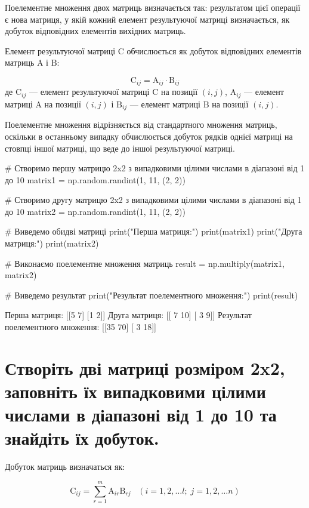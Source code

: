 \documentclass[]{article}
\newcounter{pythoncode}
\begin{document}
Поелементне множення двох матриць визначається так: результатом цієї
операції є нова матриця, у якій кожний елемент результуючої матриці
визначається, як добуток відповідних елементів вихідних матриць.

Елемент результуючої матриці \(\mathrm C\) обчислюється як добуток
відповідних елементів матриць \(\mathrm A\) і \(\mathrm B\):

\[
	\mathrm C_{ij}  = \mathrm A_{ij} \cdot \mathrm B_{ij}
\]
де \(\mathrm C_{ij}\) --- елемент результуючої матриці \(\mathrm C\) на
позиції \((i, j)\), \(\mathrm A_{ij}\) --- елемент матриці \(\mathrm A\)
на позиції \((i, j)\) і \(\mathrm B_{ij}\) --- елемент матриці
\(\mathrm B\) на позиції \((i, j)\).

Поелементне множення відрізняється від стандартного множення матриць,
оскільки в останньому випадку обчислюється добуток рядків однієї матриці
на стовпці іншої матриці, що веде до іншої результуючої матриці.

\begin{pythoncode}
    # Створимо першу матрицю 2x2 з випадковими цілими числами в діапазоні від 1 до 10
    matrix1 = np.random.randint(1, 11, (2, 2))

    # Створимо другу матрицю 2x2 з випадковими цілими числами в діапазоні від 1 до 10
    matrix2 = np.random.randint(1, 11, (2, 2))

    # Виведемо обидві матриці
    print("Перша матриця:")
    print(matrix1)
    print("Друга матриця:")
    print(matrix2)

    # Виконаємо поелементне множення матриць
    result = np.multiply(matrix1, matrix2)

    # Виведемо результат
    print("Результат поелементного множення:")
    print(result)
\end{pythoncode}

\begin{out}
	Перша матриця:
	[[5 7]
	 [1 2]]
	Друга матриця:
	[[ 7 10]
	 [ 3  9]]
	Результат поелементного множення:
	[[35 70]
	 [ 3 18]]
\end{out}

\section{Створіть дві матриці розміром 2x2, заповніть їх випадковими цілими числами в діапазоні від 1 до 10 та знайдіть їх добуток.}

Добуток матриць визначаться як:

\[\mathrm C_{ij} = \sum_{r=1}^m \mathrm A_{ir} \mathrm B_{rj} \;\;\; \left(i=1, 2, \ldots l;\; j=1, 2, \ldots n \right)\]
\end{document}
